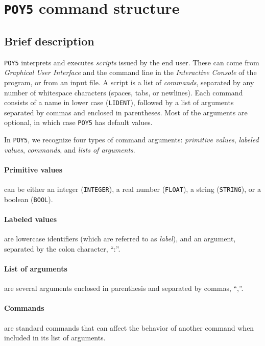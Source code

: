 \documentclass[11pt]{book}
\newcommand{\commandstyle}[1]{\texttt{#1}}
\newcommand{\poystring}{\commandstyle{STRING}\xspace}
\newcommand{\poyfloat}{\commandstyle{FLOAT}\xspace}
\newcommand{\poyint}{\commandstyle{INTEGER}\xspace}
\newcommand{\poybool}{\commandstyle{BOOL}\xspace}
\newcommand{\poylident}{\commandstyle{LIDENT}\xspace}
\newcommand{\poy}{\commandstyle{POY5}\xspace}
\begin{document}
\section{\poy command structure}

\subsection{Brief description} \label{commands}

\poy interprets and executes \emph{scripts} issued by the end user.  These can
come from \emph{Graphical User Interface} and the command line in the \emph{Interactive Console} 
of the program, or from an input file. A script is a list of \emph{commands}, separated by any number of 
whitespace characters (spaces, tabs, or newlines). Each command consists of a name in lower case 
(\poylident), followed by a list of arguments separated by commas and enclosed in parentheses. 
Most of the arguments are optional, in which case \poy has default values.

In \poy, we recognize four types of command arguments: \emph{primitive values},
\emph{labeled values}, \emph{commands}, and \emph{lists of arguments}.

\paragraph{Primitive values} can be either an integer (\poyint), a real number
(\poyfloat), a string (\poystring), or a boolean (\poybool).

\paragraph{Labeled values} are lowercase identifiers (which are referred to as
\emph{label}), and an argument, separated by the colon character, ``:''.

\paragraph{List of arguments} are several arguments enclosed in parenthesis and
separated by commas, ``,''.

\paragraph{Commands} are standard commands that can affect the behavior of
another command when included in its list of arguments.
\end{document}
